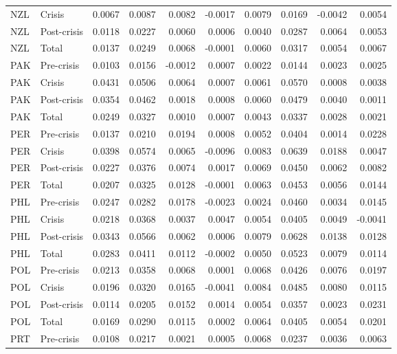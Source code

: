 \begin{longtable}[t]{llrrrrrrrr}
NZL & Crisis & 0.0067 & 0.0087 & 0.0082 & -0.0017 & 0.0079 & 0.0169 & -0.0042 & 0.0054\\
NZL & Post-crisis & 0.0118 & 0.0227 & 0.0060 & 0.0006 & 0.0040 & 0.0287 & 0.0064 & 0.0053\\
NZL & Total & 0.0137 & 0.0249 & 0.0068 & -0.0001 & 0.0060 & 0.0317 & 0.0054 & 0.0067\\
\addlinespace
PAK & Pre-crisis & 0.0103 & 0.0156 & -0.0012 & 0.0007 & 0.0022 & 0.0144 & 0.0023 & 0.0025\\
PAK & Crisis & 0.0431 & 0.0506 & 0.0064 & 0.0007 & 0.0061 & 0.0570 & 0.0008 & 0.0038\\
PAK & Post-crisis & 0.0354 & 0.0462 & 0.0018 & 0.0008 & 0.0060 & 0.0479 & 0.0040 & 0.0011\\
PAK & Total & 0.0249 & 0.0327 & 0.0010 & 0.0007 & 0.0043 & 0.0337 & 0.0028 & 0.0021\\
PER & Pre-crisis & 0.0137 & 0.0210 & 0.0194 & 0.0008 & 0.0052 & 0.0404 & 0.0014 & 0.0228\\
\addlinespace
PER & Crisis & 0.0398 & 0.0574 & 0.0065 & -0.0096 & 0.0083 & 0.0639 & 0.0188 & 0.0047\\
PER & Post-crisis & 0.0227 & 0.0376 & 0.0074 & 0.0017 & 0.0069 & 0.0450 & 0.0062 & 0.0082\\
PER & Total & 0.0207 & 0.0325 & 0.0128 & -0.0001 & 0.0063 & 0.0453 & 0.0056 & 0.0144\\
PHL & Pre-crisis & 0.0247 & 0.0282 & 0.0178 & -0.0023 & 0.0024 & 0.0460 & 0.0034 & 0.0145\\
PHL & Crisis & 0.0218 & 0.0368 & 0.0037 & 0.0047 & 0.0054 & 0.0405 & 0.0049 & -0.0041\\
\addlinespace
PHL & Post-crisis & 0.0343 & 0.0566 & 0.0062 & 0.0006 & 0.0079 & 0.0628 & 0.0138 & 0.0128\\
PHL & Total & 0.0283 & 0.0411 & 0.0112 & -0.0002 & 0.0050 & 0.0523 & 0.0079 & 0.0114\\
POL & Pre-crisis & 0.0213 & 0.0358 & 0.0068 & 0.0001 & 0.0068 & 0.0426 & 0.0076 & 0.0197\\
POL & Crisis & 0.0196 & 0.0320 & 0.0165 & -0.0041 & 0.0084 & 0.0485 & 0.0080 & 0.0115\\
POL & Post-crisis & 0.0114 & 0.0205 & 0.0152 & 0.0014 & 0.0054 & 0.0357 & 0.0023 & 0.0231\\
\addlinespace
POL & Total & 0.0169 & 0.0290 & 0.0115 & 0.0002 & 0.0064 & 0.0405 & 0.0054 & 0.0201\\
PRT & Pre-crisis & 0.0108 & 0.0217 & 0.0021 & 0.0005 & 0.0068 & 0.0237 & 0.0036 & 0.0063\\

\end{longtable}
